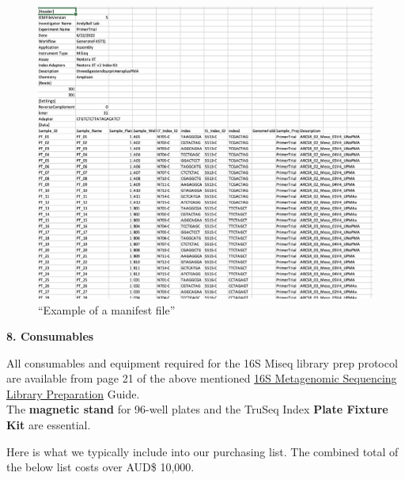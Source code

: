 \documentclass[
]{book}
\begin{document}
\begin{figure}
\centering
\includegraphics{./img/manifestfile.png}
\caption{``Example of a manifest file''}
\end{figure}

\textbf{8. Consumables}

All consumables and equipment required for the 16S Miseq library prep protocol are available from page 21 of the above mentioned \href{https://sapac.support.illumina.com/content/dam/illumina-support/documents/documentation/chemistry_documentation/16s/16s-metagenomic-library-prep-guide-15044223-b.pdf}{16S Metagenomic Sequencing Library
Preparation} Guide.\\
The \textbf{magnetic stand} for 96-well plates and the TruSeq Index \textbf{Plate Fixture Kit} are essential.

Here is what we typically include into our purchasing list. The combined total of the below list costs over AUD\$ 10,000.
\end{document}
